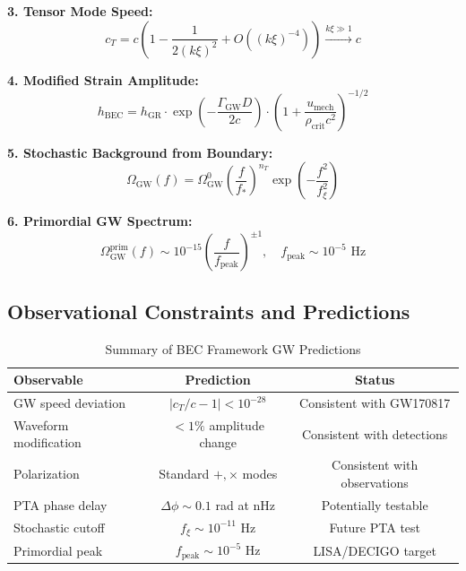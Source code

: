 \documentclass[11pt,a4paper]{article}
\newcommand{\rhocrit}{\ensuremath{\rho_{\mathrm{crit}}}}
\newcommand{\cT}{\ensuremath{c_T}}
\newcommand{\umech}{\ensuremath{u_{\mathrm{mech}}}}
\theoremstyle{definition}
\theoremstyle{remark}
\begin{document}
\textbf{3. Tensor Mode Speed:}
\begin{equation}
\cT = c\left(1 - \frac{1}{2(k\xi)^2} + O((k\xi)^{-4})\right) \xrightarrow{k\xi \gg 1} c
\end{equation}

\textbf{4. Modified Strain Amplitude:}
\begin{equation}
h_{\mathrm{BEC}} = h_{\mathrm{GR}} \cdot \exp\left(-\frac{\Gamma_{\mathrm{GW}} D}{2c}\right) \cdot \left(1 + \frac{\umech}{\rhocrit c^2}\right)^{-1/2}
\end{equation}

\textbf{5. Stochastic Background from Boundary:}
\begin{equation}
\Omega_{\mathrm{GW}}(f) = \Omega_{\mathrm{GW}}^0 \left(\frac{f}{f_*}\right)^{n_T} \exp\left(-\frac{f^2}{f_\xi^2}\right)
\end{equation}

\textbf{6. Primordial GW Spectrum:}
\begin{equation}
\Omega_{\mathrm{GW}}^{\mathrm{prim}}(f) \sim 10^{-15}\left(\frac{f}{f_{\mathrm{peak}}}\right)^{\pm 1}, \quad f_{\mathrm{peak}} \sim 10^{-5} \text{ Hz}
\end{equation}

\subsection{Observational Constraints and Predictions}

\begin{table}[H]
\centering
\caption{Summary of BEC Framework GW Predictions}
\label{tab:summary}
\begin{tabular}{@{}lcc@{}}
\toprule
\textbf{Observable} & \textbf{Prediction} & \textbf{Status} \\
\midrule
GW speed deviation & $|\cT/c - 1| < 10^{-28}$ & Consistent with GW170817 \\
Waveform modification & $<1\%$ amplitude change & Consistent with detections \\
Polarization & Standard $+, \times$ modes & Consistent with observations \\
PTA phase delay & $\Delta\phi \sim 0.1$ rad at nHz & Potentially testable \\
Stochastic cutoff & $f_\xi \sim 10^{-11}$ Hz & Future PTA test \\
Primordial peak & $f_{\mathrm{peak}} \sim 10^{-5}$ Hz & LISA/DECIGO target \\
\bottomrule
\end{tabular}
\end{table}
\end{document}
